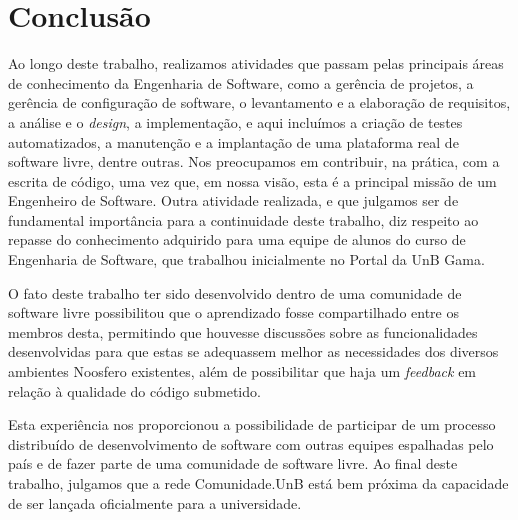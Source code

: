\section{Conclusão}
\label{sec:conclusao}

Ao longo deste trabalho, realizamos atividades que passam
pelas principais áreas de conhecimento da Engenharia de Software, como a
gerência de projetos, a gerência de configuração de software,
o levantamento e a elaboração de requisitos, a análise e o \textit{design},
a implementação, e aqui incluímos a criação de testes automatizados,
a manutenção e a implantação de uma plataforma real de software livre, dentre
outras.
%
Nos preocupamos em contribuir, na prática, com a escrita de código,
uma vez que, em nossa visão, esta é a principal missão de um Engenheiro de
Software.
%
Outra atividade realizada, e que julgamos ser de fundamental importância para a
continuidade deste trabalho, diz respeito ao repasse do conhecimento adquirido
para uma equipe de alunos do curso de Engenharia de Software, que trabalhou
inicialmente no Portal da UnB Gama.

O fato deste trabalho ter sido desenvolvido dentro de uma comunidade de
software livre possibilitou que o aprendizado fosse compartilhado entre
os membros desta, permitindo que houvesse discussões sobre as funcionalidades
desenvolvidas para que estas se adequassem melhor as necessidades dos diversos
ambientes Noosfero existentes, além de possibilitar que haja um \textit{feedback}
em relação à qualidade do código submetido.

Esta experiência nos proporcionou a possibilidade de participar de um processo
distribuído de desenvolvimento de software com outras equipes espalhadas pelo
país e de fazer parte de uma comunidade de software livre.
%
Ao final deste trabalho, julgamos que a rede Comunidade.UnB está bem próxima
da capacidade de ser lançada oficialmente para a universidade.
